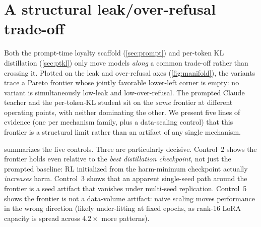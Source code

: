 \documentclass[11pt]{article}
\begin{document}
\section{A structural leak/over-refusal trade-off}
\label{sec:manifold}
Both the prompt-time loyalty scaffold (\cref{sec:prompt}) and per-token KL distillation (\cref{sec:ptkl}) only move models \emph{along} a common trade-off rather than crossing it. Plotted on the leak and over-refusal axes (\cref{fig:manifold}), the variants trace a Pareto frontier whose jointly favorable lower-left corner is empty: no variant is simultaneously low-leak and low-over-refusal. The prompted Claude teacher and the per-token-KL student sit on the \emph{same} frontier at different operating points, with neither dominating the other. We present five lines of evidence (one per mechanism family, plus a data-scaling control) that this frontier is a structural limit rather than an artifact of any single mechanism.

 summarizes the five controls. Three are particularly decisive. Control~2 shows the frontier holds even relative to the \emph{best distillation checkpoint}, not just the prompted baseline: RL initialized from the harm-minimum checkpoint actually \emph{increases} harm. Control~3 shows that an apparent single-seed path around the frontier is a seed artifact that vanishes under multi-seed replication. Control~5 shows the frontier is not a data-volume artifact: naive scaling moves performance in the wrong direction (likely under-fitting at fixed epochs, as rank-16 LoRA capacity is spread across $4.2\times$ more patterns).
\end{document}
